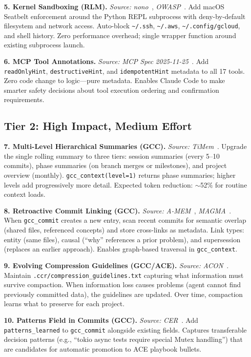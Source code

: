 \documentclass[11pt]{article}
\begin{document}
\textbf{5. Kernel Sandboxing (RLM).} \textit{Source: nono}~\cite{nono}, \textit{OWASP}~\cite{owasp_agentic}. Add macOS Seatbelt enforcement around the Python REPL subprocess with deny-by-default filesystem and network access. Auto-block \texttt{\textasciitilde/.ssh}, \texttt{\textasciitilde/.aws}, \texttt{\textasciitilde/.config/gcloud}, and shell history. Zero performance overhead; single wrapper function around existing subprocess launch.

\textbf{6. MCP Tool Annotations.} \textit{Source: MCP Spec 2025-11-25}~\cite{mcp_spec}. Add \texttt{readOnlyHint}, \texttt{destructiveHint}, and \texttt{idempotentHint} metadata to all 17 tools. Zero code change to logic---pure metadata. Enables Claude Code to make smarter safety decisions about tool execution ordering and confirmation requirements.

\subsection{Tier 2: High Impact, Medium Effort}

\textbf{7. Multi-Level Hierarchical Summaries (GCC).} \textit{Source: TiMem}~\cite{timem}. Upgrade the single rolling summary to three tiers: session summaries (every 5--10 commits), phase summaries (on branch merges or milestones), and project overview (monthly). \texttt{gcc\_context(level=1)} returns phase summaries; higher levels add progressively more detail. Expected token reduction: $\sim$52\% for routine context loads.

\textbf{8. Retroactive Commit Linking (GCC).} \textit{Source: A-MEM}~\cite{amem}, \textit{MAGMA}~\cite{magma}. When \texttt{gcc\_commit} creates a new entry, scan recent commits for semantic overlap (shared files, referenced concepts) and store cross-links as metadata. Link types: entity (same files), causal (``why'' references a prior problem), and supersession (replaces an earlier approach). Enables graph-based traversal in \texttt{gcc\_context}.

\textbf{9. Evolving Compression Guidelines (GCC/ACE).} \textit{Source: ACON}~\cite{acon}. Maintain \texttt{.ccr/compression\_guidelines.txt} capturing what information must survive compaction. When information loss causes problems (agent cannot find previously committed data), the guidelines are updated. Over time, compaction learns what to preserve for each project.

\textbf{10. Patterns Field in Commits (GCC).} \textit{Source: CER}~\cite{cer}. Add \texttt{patterns\_learned} to \texttt{gcc\_commit} alongside existing fields. Captures transferable decision patterns (e.g., ``tokio async tests require special Mutex handling'') that are candidates for automatic promotion to ACE playbook bullets.
\end{document}
